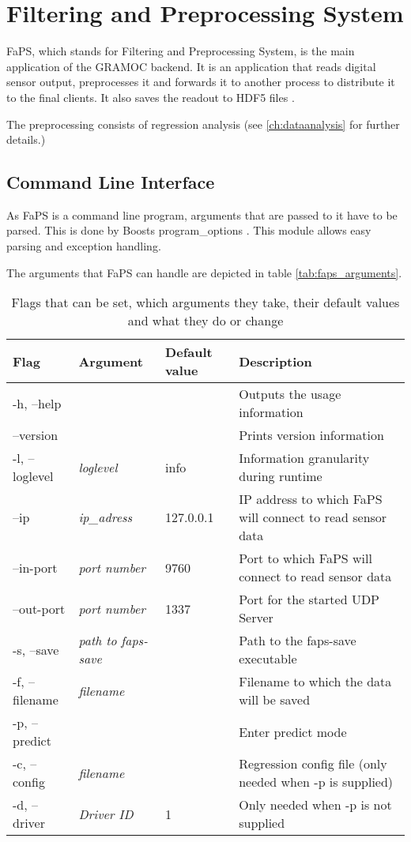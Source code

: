 \chapter{Filtering and Preprocessing System}
\label{ch:faps}

\author{Nico Kratky}
%
FaPS, which stands for Filtering and Preprocessing System, is the main application of the GRAMOC backend. It is an application that reads digital sensor output, preprocesses it and forwards it to another process to distribute it to the final clients. It also saves the readout to HDF5 files \autocite{HDF5}.

The preprocessing consists of regression analysis (see \vref{ch:dataanalysis} for further details.)

\section{Command Line Interface}

As FaPS is a command line program, arguments that are passed to it have to be parsed. This is done by Boosts program\_options \autocite{BoostProgramOptions}. This module allows easy parsing and exception handling.

The arguments that FaPS can handle are depicted in table \vref{tab:faps_arguments}.

\begin{table}[h]
    \centering
    \begin{tabular}{| l | l | l | p{5cm} |}
    \hline
    \textbf{Flag} & \textbf{Argument} & \textbf{Default value} & \textbf{Description} \\ \hline
    -h, --help & & & Outputs the usage information \\ \hline
    --version & & & Prints version information \\ \hline
    -l, --loglevel & \textit{loglevel} & info & Information granularity during runtime \\ \hline
    --ip & \textit{ip\_adress} & 127.0.0.1 & IP address to which FaPS will connect to read sensor data \\ \hline
    --in-port & \textit{port number} & 9760 & Port to which FaPS will connect to read sensor data \\ \hline
    --out-port & \textit{port number} & 1337 & Port for the started UDP Server \\ \hline
    -s, --save & \textit{path to faps-save} & & Path to the faps-save executable \\ \hline
    -f, --filename & \textit{filename} & & Filename to which the data will be saved \\ \hline
    -p, --predict & & & Enter predict mode \\ \hline
    -c, --config & \textit{filename} & & Regression config file (only needed when -p is supplied)  \\ \hline
    -d, --driver & \textit{Driver ID} & 1 & Only needed when -p is not supplied \\ \hline
    \end{tabular}
    \caption{Flags that can be set, which arguments they take, their default values and what they do or change}
    \label{tab:faps_arguments}
\end{table}

